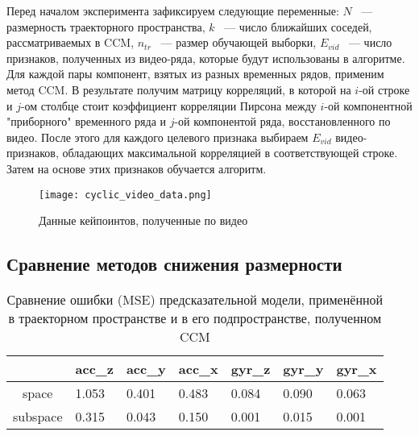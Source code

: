\documentclass[a4paper, 12pt]{article}
\begin{document}
Перед началом эксперимента зафиксируем следующие переменные: $N$ ~--- размерность траекторного пространства, $k$ ~--- число ближайших соседей, рассматриваемых в CCM, $n_{tr}$ ~--- размер обучающей выборки, $E_{vid}$ ~--- число признаков, полученных из видео-ряда, которые будут использованы в алгоритме.
Для каждой пары компонент, взятых из разных временных рядов, применим метод CCM.
В результате получим матрицу корреляций, в которой на $i\text{-ой}$ строке и $j\text{-ом}$ столбце стоит коэффициент корреляции Пирсона между $i\text{-ой}$ компонентной "приборного" временного ряда и $j\text{-ой}$ компонентой ряда, восстановленного по видео. 
После этого для каждого целевого признака выбираем $E_{vid}$ видео-признаков, обладающих максимальной корреляцией в соответствующей строке.
Затем на основе этих признаков обучается алгоритм.

\begin{figure}[bhtp]
	\texttt{[image: cyclic\_video\_data.png]}
	\caption{Данные кейпоинтов, полученные по видео}
	\label{fig:video_data}
\end{figure}

\subsection{Сравнение методов снижения размерности}
\begin{table}[bhtp]
	\centering
	\caption{Сравнение ошибки (MSE) предсказательной модели, применённой в траекторном пространстве и в его подпространстве, полученном CCM}
	\begin{tabular}{c|llllll}
		\hline
		& acc\_z & acc\_y & acc\_x & gyr\_z & gyr\_y & gyr\_x \\
		\hline
		space & 1.053 & 0.401 & 0.483 & 0.084 & 0.090 & 0.063 \\
		subspace & 0.315 & 0.043 & 0.150 & 0.001 & 0.015 & 0.001 \\
		\hline
	\end{tabular}
\end{table}
\end{document}

